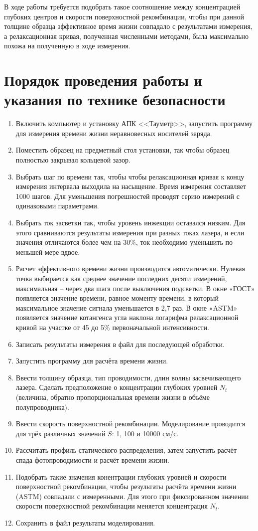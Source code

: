 В ходе работы требуется подобрать такое соотношение между концентрацией глубоких центров и скорости поверхностной рекомбинации, чтобы при данной толщине образца эффективное время жизни совпадало с результатами измерения, а релаксационная кривая, полученная численными методами, была максимально похожа на полученную в ходе измерения.

\section{Порядок проведения работы и указания по технике безопасности}

\begin{enumerate}
\item Включить компьютер и установку АПК <<Тауметр>>, запустить программу для измерения времени жизни неравновесных носителей заряда.
\item Поместить образец на предметный стол установки, так чтобы образец полностью закрывал кольцевой зазор.
\item Выбрать шаг по времени так, чтобы чтобы релаксационная кривая к концу измерения интервала выходила на насыщение. Время измерения составляет 1000 шагов. Для уменьшения погрешностей проводят серию измерений с одинаковыми параметрами.
\item Выбрать ток засветки так, чтобы уровень инжекции оставался низким. Для этого сравниваются результаты измерения при разных токах лазера, и если значения отличаются более чем на 30\%, ток необходимо уменьшить по меньшей мере вдвое.
\item Расчет эффективного времени жизни производится автоматически. Нулевая точка выбирается как среднее значение последних десяти измерений, максимальная – через два шага после выключения подсветки. В окне «ГОСТ» появляется значение времени, равное моменту времени, в который максимальное значение сигнала уменьшается в 2,7 раз. В окне «ASTM» появляется значение котангенса угла наклона логарифма релаксационной кривой на участке от 45 до 5\% первоначальной интенсивности.
\item Записать результаты измерения в файл для последующей обработки.
\item Запустить программу для расчёта времени жизни.
\item Ввести толщину образца, тип проводимости, длин волны засвечивающего лазера. Сделать предположение о концентрации глубоких уровней $N_{t}$ (величина, обратно пропорциональная времени жизни в объёме полупроводника).
\item Ввести скорость поверхностной рекомбинации. Моделирование проводится для трёх различных значений $S$: 1, 100 и 10000 см/с.
\item Рассчитать профиль статического распределения, затем запустить расчёт спада фотопроводимости и расчёт времени жизни.
\item Подобрать такие значения конентрации глубоких уровней и скорости поверхностной рекомбинации, чтобы результаты расчёта времени жизни (ASTM) совпадали с измеренными. Для этого при фиксированном значении скорости поверхностной рекомбинации меняется концентрация $N_{t}$.
\item Сохранить в файл результаты моделирования.
\end{enumerate}

